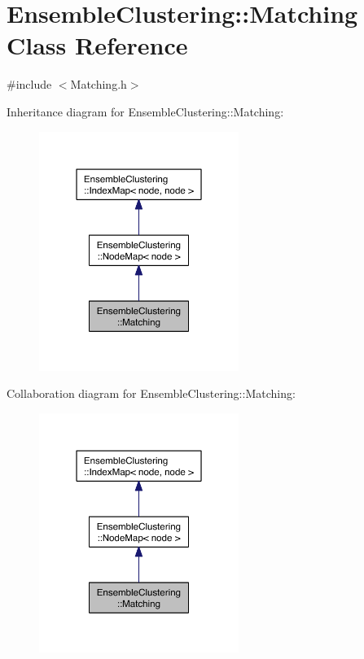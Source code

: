 \hypertarget{class_ensemble_clustering_1_1_matching}{\section{Ensemble\-Clustering\-:\-:Matching Class Reference}
\label{class_ensemble_clustering_1_1_matching}
}


{\ttfamily \#include $<$Matching.\-h$>$}



Inheritance diagram for Ensemble\-Clustering\-:\-:Matching\-:
\nopagebreak
\begin{figure}[H]
\begin{center}
\leavevmode
\includegraphics[width=184pt]{class_ensemble_clustering_1_1_matching__inherit__graph}
\end{center}
\end{figure}


Collaboration diagram for Ensemble\-Clustering\-:\-:Matching\-:
\nopagebreak
\begin{figure}[H]
\begin{center}
\leavevmode
\includegraphics[width=184pt]{class_ensemble_clustering_1_1_matching__coll__graph}
\end{center}
\end{figure}
